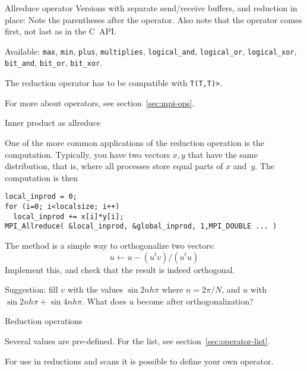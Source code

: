 \begin{mplnote}{Allreduce operator}
  Versions with separate send/receive buffers,
  and reduction in place:
  Note the parentheses after the operator.
  Also note that the operator comes first, not last as in the C~\ac{API}.

  Available: \lstinline{max}, \lstinline{min}, \lstinline{plus}, \lstinline{multiplies},
  \lstinline{logical_and}, \lstinline{logical_or}, \lstinline{logical_xor},
  \lstinline{bit_and}, \lstinline{bit_or}, \lstinline{bit_xor}.

  \begin{mplimpl}
    The reduction operator has to be compatible with
    \lstinline+T(T,T)>+.
  \end{mplimpl}
\end{mplnote}

For more about operators, see section~\ref{sec:mpi-ops}.

 {Inner product as allreduce}
\label{sec:dist-reduc}

One of the more common applications of the reduction operation
is the  computation. Typically, you have two vectors $x,y$
that have the same distribution, that is,
where all processes store equal parts of $x$ and~$y$.
The computation is then
\begin{lstlisting}
local_inprod = 0;
for (i=0; i<localsize; i++)
  local_inprod += x[i]*y[i];
MPI_Allreduce( &local_inprod, &global_inprod, 1,MPI_DOUBLE ... ) 
\end{lstlisting}

\begin{exercise}
  \label{ex:gramschmidt}
  The  method is a simple way to orthogonalize
  two vectors:
  \[ u \leftarrow u- (u^tv)/(u^tu) \]
  Implement this, and check that the result is indeed orthogonal.

  Suggestion: fill $v$ with the values $\sin 2nh\pi$ where $n=2\pi/N$,
  and $u$ with $\sin 2nh\pi + \sin 4nh\pi$. What does $u$ become after orthogonalization?
\end{exercise}

 {Reduction operations}
\label{sec:mpi:op-reduct}

Several  values are pre-defined. For the list,
see section~\ref{sec:operator-list}.

For use in reductions and scans it is possible to define your own operator.

